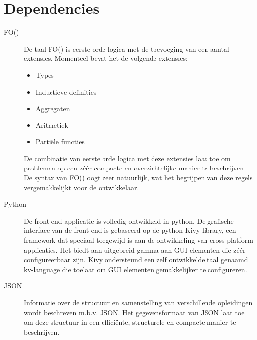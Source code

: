 \section{Dependencies}
\begin{description}
\item [FO(\textperiodcentered)] De taal FO(\textperiodcentered) is eerste orde logica met de toevoeging van een aantal extensies. Momenteel bevat het de volgende extensies:
\begin{itemize}
\itemsep0em
\item Types
\item Inductieve definities
\item Aggregaten
\item Aritmetiek
\item Parti\"{e}le functies
\end{itemize}
De combinatie van eerste orde logica met deze extensies laat toe om problemen op een z\'{e}\'{e}r compacte en overzichtelijke manier te beschrijven. De syntax van FO(\textperiodcentered) oogt zeer natuurlijk, wat het begrijpen van deze regels vergemakkelijkt voor de ontwikkelaar. 
\item [Python] De front-end applicatie is volledig ontwikkeld in python. De grafische interface van de front-end is gebaseerd op de python Kivy library, een framework dat speciaal toegewijd is aan de ontwikkeling van cross-platform applicaties. Het biedt aan uitgebreid gamma aan GUI elementen die z\'{e}\'{e}r configureerbaar zijn. Kivy ondersteund een zelf ontwikkelde taal genaamd kv-language die toelaat om GUI elementen gemakkelijker te configureren. 
\item [JSON] Informatie over de structuur en samenstelling van verschillende opleidingen wordt beschreven m.b.v. JSON. Het gegevensformaat van JSON laat toe om deze structuur in een effici\"{e}nte, structurele en compacte manier te beschrijven. 
\end{description}